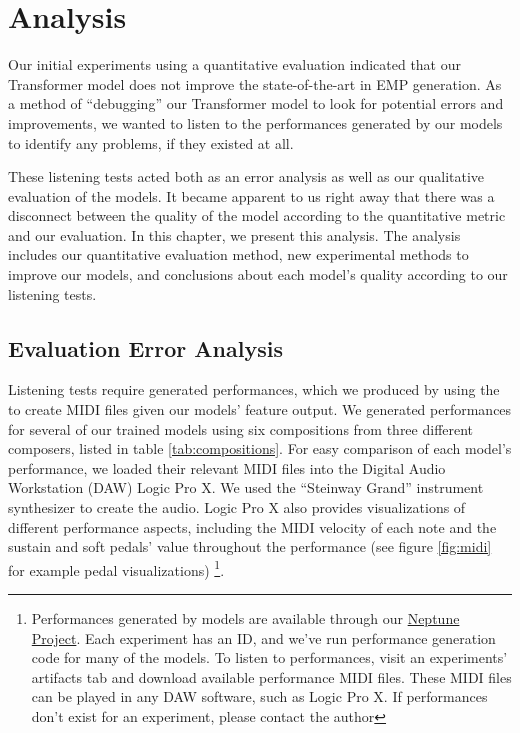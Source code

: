 \chapter{Analysis} \label{ch:ch6}
Our initial experiments using a quantitative evaluation indicated that our Transformer model does not improve the state-of-the-art in EMP generation. As a method of ``debugging'' our Transformer model to look for potential errors and improvements, we wanted to listen to the performances generated by our models to identify any problems, if they existed at all. 

These listening tests acted both as an error analysis as well as our qualitative evaluation of the models. It became apparent to us right away that there was a disconnect between the quality of the model according to the quantitative metric and our evaluation. In this chapter, we present this analysis. The analysis includes our quantitative evaluation method, new experimental methods to improve our models, and conclusions about each model's quality according to our listening tests. 



\section{Evaluation Error Analysis}\label{sec:qualitative-eval-problems}
Listening tests require generated performances, which we produced by using the \vnetf{} to create MIDI files given our models' feature output. We generated performances for several of our trained models using six compositions from three different composers, listed in table \ref{tab:compositions}. For easy comparison of each model's performance, we loaded their relevant MIDI files into the Digital Audio Workstation (DAW) Logic Pro X. We used the ``Steinway Grand'' instrument synthesizer to create the audio. Logic Pro X also provides visualizations of different performance aspects, including the MIDI velocity of each note and the sustain and soft pedals' value throughout the performance (see figure \ref{fig:midi} for example pedal visualizations)%
\footnote{Performances generated by models are available through our \href{https://ui.neptune.ai/richt3211/thesis/experiments}{Neptune Project}. Each experiment has an ID, and we've run performance generation code for many of the models. To listen to performances, visit an experiments' artifacts tab and download available performance MIDI files. These MIDI files can be played in any DAW software, such as Logic Pro X. If performances don't exist for an experiment, please contact the author}. 

